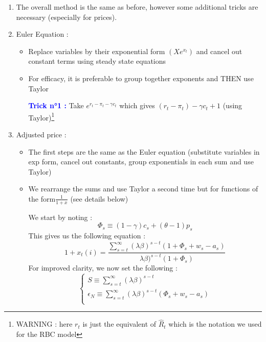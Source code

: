 \documentclass{article}
\begin{document}
\begin{enumerate}
    \item The overall method is the same as before, however some additional tricks are necessary (especially for prices).
    \item Euler Equation : 
    \begin{itemize}
        \item Replace variables by their exponential form $(Xe^{x_t})$ and cancel out constant terms using steady state equations
        \item For efficacy, it is preferable to group together exponents and THEN use Taylor
        \begin{expectedresultsbox}
     \textcolor{blue}{\textbf{Trick n°1 : }}Take $e^{r_t-\pi_t-\gamma c_t}$ which gives $(r_t-\pi_t)-\gamma c_t + 1$ (using Taylor)\footnote{WARNING : here $r_t$ is just the equivalent of $\hat{R}_t$ which is the notation we used for the RBC model}
        \end{expectedresultsbox}
    \end{itemize}
    \item Adjusted price : 
    \begin{itemize}
        \item The first steps are the same as the Euler equation (substitute variables in exp form, cancel out constants, group exponentials in each sum and use Taylor)
        \item We rearrange the sums and use Taylor a second time but for functions of the form$\frac{1}{1+x}$ (see details below)
        \begin{TDbox}
            We start by noting : 
            \begin{equation}
                \Phi_s \equiv (1-\gamma)c_s + (\theta-1)p_s
            \end{equation}
            This gives us the following equation : 
            \begin{equation}
                1+x_t(i)=\frac{ \sum_{s=t}^\infty (\lambda\beta)^{s-t}(1+\Phi_s+w_s-a_s)}{\lambda\beta)^{s-t}(1+\Phi_s)}
            \end{equation}
            For improved clarity, we now set the following : 
            \begin{equation}
            \left\{
            \begin{aligned}
               S \equiv \sum_{s=t}^\infty (\lambda\beta)^{s-t} \\
               \epsilon_N \equiv \sum_{s=t}^\infty (\lambda\beta)^{s-t} (\Phi_s+w_s-a_s)\\

\end{aligned}
\end{equation}
\end{TDbox}
\end{itemize}
\end{enumerate}
\end{document}
